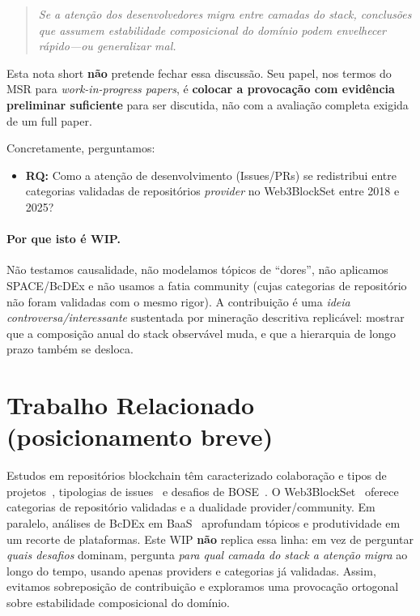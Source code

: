 \documentclass[10pt,conference]{IEEEtran}
\begin{document}
\begin{quote}
\emph{Se a atenção dos desenvolvedores migra entre camadas do stack, conclusões que assumem estabilidade composicional do domínio podem envelhecer rápido---ou generalizar mal.}
\end{quote}

Esta nota short \textbf{não} pretende fechar essa discussão. Seu papel, nos termos do MSR para \emph{work-in-progress papers}, é \textbf{colocar a provocação com evidência preliminar suficiente} para ser discutida, não com a avaliação completa exigida de um full paper.

Concretamente, perguntamos:

\begin{itemize}
\item \textbf{RQ:} Como a atenção de desenvolvimento (Issues/PRs) se redistribui entre categorias validadas de repositórios \emph{provider} no Web3BlockSet entre 2018 e 2025?
\end{itemize}

\paragraph{Por que isto é WIP.}
Não testamos causalidade, não modelamos tópicos de ``dores'', não aplicamos SPACE/BcDEx e não usamos a fatia community (cujas categorias de repositório não foram validadas com o mesmo rigor). A contribuição é uma \emph{ideia controversa/interessante} sustentada por mineração descritiva replicável: mostrar que a composição anual do stack observável muda, e que a hierarquia de longo prazo também se desloca.

\section{Trabalho Relacionado (posicionamento breve)}

Estudos em repositórios blockchain têm caracterizado colaboração e tipos de projetos~\cite{das2022blockchain}, tipologias de issues~\cite{opu2025issuetypes} e desafios de BOSE~\cite{porru2017bose}. O Web3BlockSet~\cite{soares2026web3blockset} oferece categorias de repositório validadas e a dualidade provider/community. Em paralelo, análises de BcDEx em BaaS~\cite{soares2025bcdex} aprofundam tópicos e produtividade em um recorte de plataformas. Este WIP \textbf{não} replica essa linha: em vez de perguntar \emph{quais desafios} dominam, pergunta \emph{para qual camada do stack a atenção migra} ao longo do tempo, usando apenas providers e categorias já validadas. Assim, evitamos sobreposição de contribuição e exploramos uma provocação ortogonal sobre estabilidade composicional do domínio.
\end{document}
